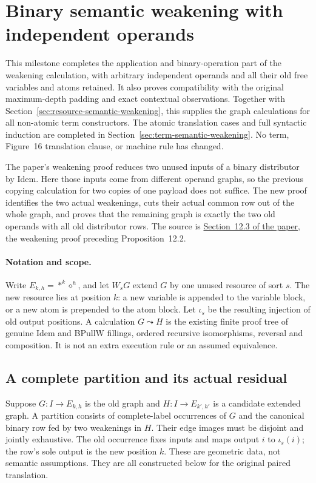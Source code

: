 \clearpage
\section{Binary semantic weakening with independent operands}
\label{sec:binary-semantic-weakening}
This milestone completes the application and binary-operation part of the
weakening calculation, with arbitrary independent operands and all their
old free variables and atoms retained. It also proves compatibility with
the original maximum-depth padding and exact contextual observations.
Together with Section~\ref{sec:resource-semantic-weakening}, this supplies
the graph calculations for all non-atomic term constructors. The atomic
translation cases and full syntactic induction are completed in
Section~\ref{sec:term-semantic-weakening}.
No term, Figure~16 translation clause, or machine rule has changed.

The paper's weakening proof reduces two unused inputs of a binary distributor
by Idem. Here those inputs come from different operand graphs, so the
previous copying calculation for two copies of one payload does not suffice.
The new proof identifies the two actual weakenings, cuts their actual common
row out of the whole graph, and proves that the remaining graph is exactly
the two old operands with all old distributor rows. The source is
\href{https://arxiv.org/html/1907.01257v5\#S12.SS3}{Section~12.3 of the paper},
the weakening proof preceding Proposition~12.2.

\paragraph{Notation and scope.}
Write $E_{k,h}=*^k\diamond^h$, and let $W_sG$ extend $G$ by one unused
resource of sort $s$. The new resource lies at position $k$: a new variable
is appended to the variable block, or a new atom is prepended to the atom
block. Let $\iota_s$ be the resulting injection of old output positions.
A calculation $G\leadsto H$ is the existing finite proof tree of genuine
Idem and BPullW fillings, ordered recursive isomorphisms, reversal and
composition. It is not an extra execution rule or an assumed equivalence.

\subsection{A complete partition and its actual residual}
Suppose $G:I\to E_{k,h}$ is the old graph and $H:I\to E_{k',h'}$ is a
candidate extended graph. A partition consists of complete-label occurrences
of $G$ and the canonical binary row fed by two weakenings in $H$. Their edge
images must be disjoint and jointly exhaustive. The old occurrence fixes
inputs and maps output $i$ to $\iota_s(i)$; the row's sole output is the new
position $k$. These are geometric data, not semantic assumptions. They are
all constructed below for the original paired translation.

